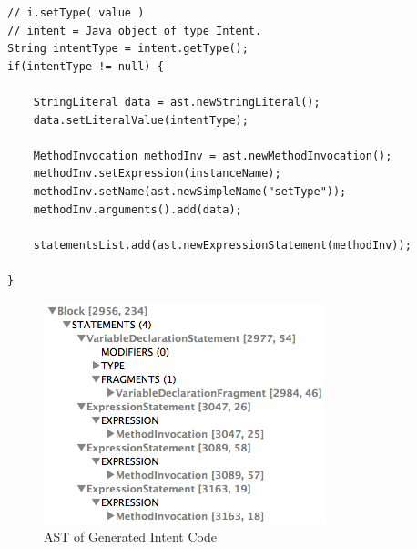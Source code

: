 {\footnotesize\begin{lstlisting}[label=astjavacodesettype,caption=Java code to set type property]
// i.setType( value )
// intent = Java object of type Intent.
String intentType = intent.getType();
if(intentType != null) {

	StringLiteral data = ast.newStringLiteral();
	data.setLiteralValue(intentType);
	
	MethodInvocation methodInv = ast.newMethodInvocation();
	methodInv.setExpression(instanceName);
	methodInv.setName(ast.newSimpleName("setType"));
	methodInv.arguments().add(data);
	
	statementsList.add(ast.newExpressionStatement(methodInv));
	
}		
\end{lstlisting}}

\begin{figure}[t]
\label{intenttreeview}
  \centering
    \includegraphics[width=.5\textwidth]{ast}
  \caption{AST of Generated Intent Code}
\end{figure}
